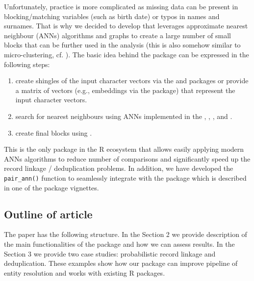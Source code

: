 Unfortunately, practice is more complicated as missing data can be
present in blocking/matching variables (such as birth date) or typos in
names and surnames. That is why we decided to develop 
that leverages approximate nearest neighbour (ANNs) algorithms and graphs
to create a large number of small blocks that can be further used in the
analysis (this is also somehow similar to micro-clustering, cf.
\citet{johndrow2018theoretical}). The basic idea behind the 
package can be expressed in the following steps:

\begin{enumerate}
\def\labelenumi{\arabic{enumi}.}
\tightlist
\item
  create shingles of the input character vectors via the
   \citep{tokenizers} and 
  \citep{text2vec} packages or provide a matrix of vectors (e.g.,
  embeddings via the  \citep{ragnar} package) that
  represent the input character vectors.
\item
  search for nearest neighbours using ANNs
  implemented in the  \citep{rnndescent},
   \citep{RcppHNSW},  \citep[
  \citet{mlpack2025}]{mlpack2023}, and  \citep{RcppAnnoy}.
\item
  create final blocks using  \citep[
  \citet{igraph2006}]{igraph2025}.
\end{enumerate}

This is the only package in the R ecosystem that allows easily applying
modern ANNs algorithms to reduce number of comparisons
and significantly speed up the record
linkage / deduplication problems. In addition, we have developed the
\texttt{pair\_ann()} function to seamlessly integrate with the 
package which is described in one of the package vignettes.

\subsection{Outline of article}\label{outline-of-article}

The paper has the following structure. In the Section 2
we provide description of the main functionalities of the 
package and how we can assess results. In the Section 3 we
provide two case studies: probabilistic record linkage and
deduplication. These examples show how our package can improve pipeline
of entity resolution and works with existing R packages.

